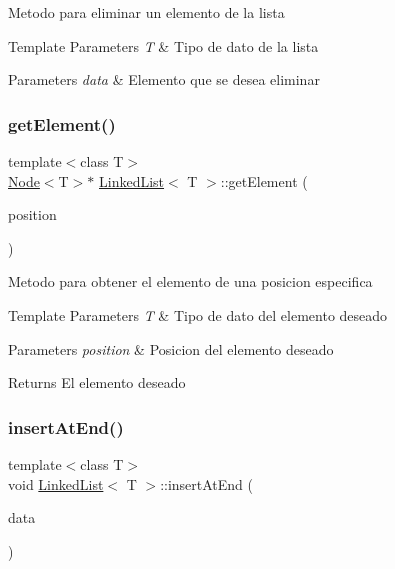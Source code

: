 Metodo para eliminar un elemento de la lista 
\begin{DoxyTemplParams}{Template Parameters}
{\em T} & Tipo de dato de la lista \\
\hline
\end{DoxyTemplParams}

\begin{DoxyParams}{Parameters}
{\em data} & Elemento que se desea eliminar \\
\hline
\end{DoxyParams}
\mbox{\label{classLinkedList_a6171fa1f4f2a8256f8e15248bcf43752}} 
\subsubsection{\texorpdfstring{get\+Element()}{getElement()}}
{\footnotesize\ttfamily template$<$class T$>$ \\
\hyperlink{classNode}{Node}$<$T$>$$\ast$ \hyperlink{classLinkedList}{Linked\+List}$<$ T $>$\+::get\+Element (\begin{DoxyParamCaption}\item[{int}]{position }\end{DoxyParamCaption})\hspace{0.3cm}{\ttfamily [inline]}}

Metodo para obtener el elemento de una posicion especifica 
\begin{DoxyTemplParams}{Template Parameters}
{\em T} & Tipo de dato del elemento deseado \\
\hline
\end{DoxyTemplParams}

\begin{DoxyParams}{Parameters}
{\em position} & Posicion del elemento deseado \\
\hline
\end{DoxyParams}
\begin{DoxyReturn}{Returns}
El elemento deseado 
\end{DoxyReturn}
\mbox{\label{classLinkedList_a01734ecd86246df5d5c8e9b235b19a05}} 
\subsubsection{\texorpdfstring{insert\+At\+End()}{insertAtEnd()}}
{\footnotesize\ttfamily template$<$class T$>$ \\
void \hyperlink{classLinkedList}{Linked\+List}$<$ T $>$\+::insert\+At\+End (\begin{DoxyParamCaption}\item[{T}]{data }\end{DoxyParamCaption})\hspace{0.3cm}{\ttfamily [inline]}}

